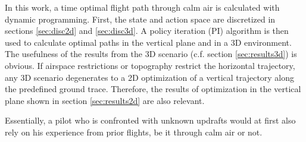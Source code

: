 In this work, a time optimal flight path through calm air is calculated with dynamic programming. First, the state and action space are discretized in sections \ref{sec:disc2d} and \ref{sec:disc3d}. A policy iteration (PI) algorithm is then used to calculate optimal paths in the vertical plane and in a 3D environment. The usefulness of the results from the 3D scenario (c.f. section \ref{sec:results3d}) is obvious. If airspace restrictions or topography restrict the horizontal trajectory, any 3D scenario degenerates to a 2D optimization of a vertical trajectory along the predefined ground trace. Therefore, the results of optimization in the vertical plane shown in section \ref{sec:results2d} are also relevant.

Essentially, a pilot who is confronted with unknown updrafts would at first also rely on his experience from prior flights, be it through calm air or not.
 